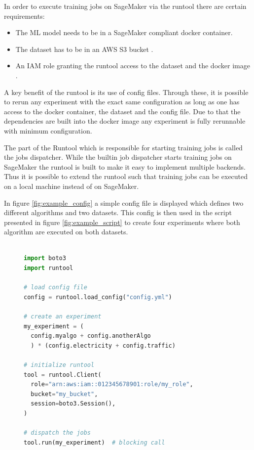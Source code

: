 In order to execute training jobs on SageMaker via the runtool there are certain requirements:
\begin{itemize}
  \item The ML model needs to be in a SageMaker compliant docker container.
  \item The dataset has to be in an AWS S3 bucket \cite{s3_website}.
  \item An IAM role granting the runtool access to the dataset and the docker image \cite{}.
\end{itemize}

A key benefit of the runtool is its use of config files. Through these, it is possible to rerun any experiment with the exact same configuration as long as one has access to the docker container, the dataset and the config file. Due to that the dependencies are built into the docker image any experiment is fully rerunnable with minimum configuration.

The part of the Runtool which is responsible for starting training jobs is called the jobs dispatcher. While the builtin job dispatcher starts training jobs on SageMaker the runtool is built to make it easy to implement multiple backends. Thus it is possible to extend the runtool such that training jobs can be executed on a local machine instead of on SageMaker.

In figure \ref{fig:example_config} a simple config file is displayed which defines two different algorithms and two datasets. This config is then used in the script presented in figure \ref{fig:example_script}  to create four experiments where both algorithm are executed on both datasets.

\begin{figure}[h]
  \begin{lstlisting}[language=Python, label={fig:example_script}, caption={Python script using the config from figure \ref{fig:example_config} to create four experiments}]

import boto3
import runtool

# load config file
config = runtool.load_config("config.yml")

# create an experiment
my_experiment = (
  config.myalgo + config.anotherAlgo
  ) * (config.electricity + config.traffic)

# initialize runtool
tool = runtool.Client(
  role="arn:aws:iam::012345678901:role/my_role",
  bucket="my_bucket",
  session=boto3.Session(),
)

# dispatch the jobs
tool.run(my_experiment)  # blocking call

  \end{lstlisting}

\end{figure}
\clearpage


